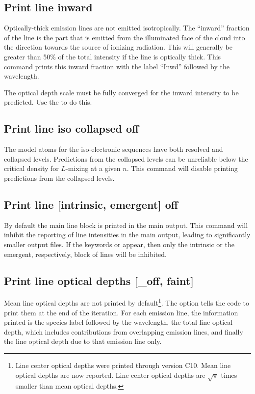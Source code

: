 \subsection{Print line inward}

Optically-thick emission lines are not emitted isotropically.
The
``inward'' fraction of the line is the part that is emitted from the
illuminated face of the cloud into the direction towards the source of
ionizing radiation.
This will generally be greater than 50\% of the total
intensity if the line is optically thick.
This command prints this inward
fraction with the label ``Inwd'' followed by the wavelength.

The optical depth scale must be fully converged for the inward
intensity to be predicted.
Use the  to do this.

\subsection{Print line iso collapsed off}
\label{sec:CommandPrintLineIsoCollapsed}

The model atoms for the iso-electronic sequences have both resolved and
collapsed levels.
Predictions from the collapsed levels can be unreliable 
below the critical density for $L$-mixing at a given $n$.
This command will disable printing predictions from the collapsed
levels.

\subsection{Print line [intrinsic, emergent] off}

By default the main line block is printed in the main output.
This command will inhibit the reporting of line intensities in
the main output, leading to significantly smaller output files.
If the keywords  or 
appear, then only the intrinsic or the emergent, respectively,
block of lines will be inhibited.

\subsection{Print line optical depths [\_off, faint]}
\label{sec:PrintLineOptDep}

Mean line optical depths are not printed by default\footnote{Line center optical
depths were printed through version C10.  Mean line optical depths
are now reported.  Line center optical depths are 
$\sqrt{ \pi}$  times smaller than mean optical depths.}.
The option tells the
code to print them at the end of the iteration.
For each emission line, the information printed is the species
label followed by the wavelength, the total line optical depth,
which includes contributions from overlapping emission lines,
and finally the line optical depth due to that emission line
only.

